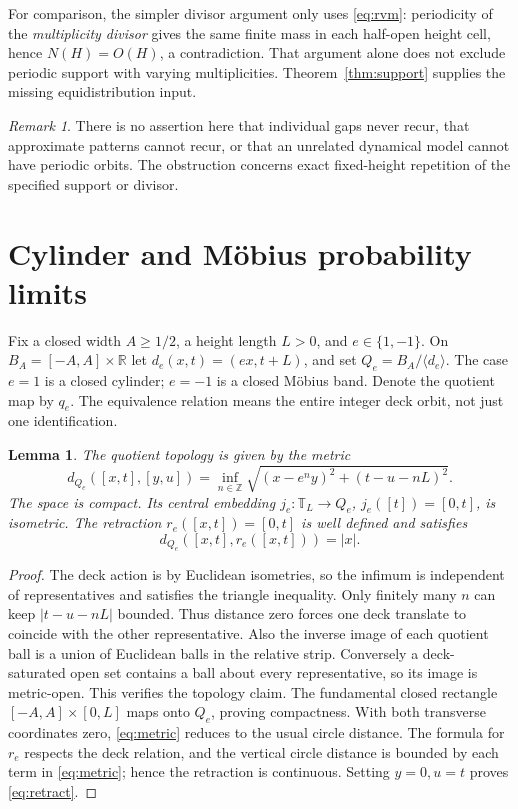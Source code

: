 \documentclass[11pt,a4paper]{article}
\newtheorem{lemma}[theorem]{Lemma}
\theoremstyle{definition}
\theoremstyle{remark}
\newtheorem{remark}[theorem]{Remark}
\newcommand{\R}{\mathbb R}
\newcommand{\Z}{\mathbb Z}
\newcommand{\T}{\mathbb T}
\begin{document}
For comparison, the simpler divisor argument only uses \eqref{eq:rvm}:
periodicity of the \emph{multiplicity divisor} gives the same finite mass in
each half-open height cell, hence $N(H)=O(H)$, a contradiction. That argument
alone does not exclude periodic support with varying multiplicities.
Theorem~\ref{thm:support} supplies the missing equidistribution input.

\begin{remark}
There is no assertion here that individual gaps never recur, that approximate
patterns cannot recur, or that an unrelated dynamical model cannot have
periodic orbits. The obstruction concerns exact fixed-height repetition of
the specified support or divisor.
\end{remark}

\section{Cylinder and M\"obius probability limits}\label{sec:quotient}

Fix a closed width $A\ge1/2$, a height length $L>0$, and $e\in\{1,-1\}$.
On $B_A=[-A,A]\times\R$ let $d_e(x,t)=(ex,t+L)$, and set
$Q_e=B_A/\langle d_e\rangle$. The case $e=1$ is a closed cylinder;
$e=-1$ is a closed M\"obius band. Denote the quotient map by $q_e$.
The equivalence relation means the entire integer deck orbit, not just
one identification.

\begin{lemma}\label{lem:metric}
The quotient topology is given by the metric
\begin{equation}\label{eq:metric}
 d_{Q_e}([x,t],[y,u])=
 \inf_{n\in\Z}\sqrt{(x-e^ny)^2+(t-u-nL)^2}.
\end{equation}
The space is compact. Its central embedding $j_e:\T_L\to Q_e$,
$j_e([t])=[0,t]$, is isometric. The retraction
$r_e([x,t])=[0,t]$ is well defined and satisfies
\begin{equation}\label{eq:retract}
 d_{Q_e}([x,t],r_e([x,t]))=|x|.
\end{equation}
\end{lemma}
\begin{proof}
The deck action is by Euclidean isometries, so the infimum is independent
of representatives and satisfies the triangle inequality. Only finitely
many $n$ can keep $|t-u-nL|$ bounded. Thus distance zero forces one deck
translate to coincide with the other representative. Also the inverse image
of each quotient ball is a union of Euclidean balls in the relative strip.
Conversely a deck-saturated open set contains a ball about every representative,
so its image is metric-open. This verifies the topology claim.
The fundamental closed rectangle $[-A,A]\times[0,L]$ maps onto $Q_e$,
proving compactness. With both transverse coordinates zero,
\eqref{eq:metric} reduces to the usual circle distance. The formula for $r_e$
respects the deck relation, and the vertical circle distance is bounded by
each term in \eqref{eq:metric}; hence the retraction is continuous. Setting
$y=0,u=t$ proves \eqref{eq:retract}.
\end{proof}
\end{document}
